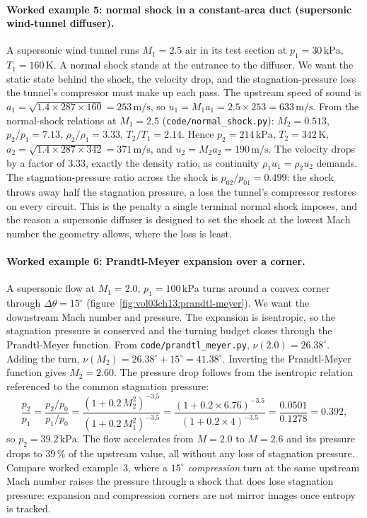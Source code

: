 \paragraph{Worked example 5: normal shock in a constant-area duct
(supersonic wind-tunnel diffuser).} A supersonic wind tunnel runs
$M_1 = 2.5$ air in its test section at $p_1 = 30\,\text{kPa}$,
$T_1 = 160\,\si{\kelvin}$. A normal shock stands at the entrance to the
diffuser. We want the static state behind the shock, the velocity
drop, and the stagnation-pressure loss the tunnel's compressor must
make up each pass. The upstream speed of sound is $a_1 =
\sqrt{1.4\times 287\times 160} = 253\,\si{\meter\per\second}$, so
$u_1 = M_1 a_1 = 2.5\times 253 = 633\,\si{\meter\per\second}$. From the
normal-shock relations at $M_1 = 2.5$
(\texttt{code/normal\_shock.py}): $M_2 = 0.513$, $p_2/p_1 = 7.13$,
$\rho_2/\rho_1 = 3.33$, $T_2/T_1 = 2.14$. Hence $p_2 = 214\,\text{kPa}$,
$T_2 = 342\,\si{\kelvin}$, $a_2 = \sqrt{1.4\times 287\times 342} =
371\,\si{\meter\per\second}$, and $u_2 = M_2 a_2 = 190\,\si{\meter\per
\second}$. The velocity drops by a factor of $3.33$, exactly the
density ratio, as continuity $\rho_1 u_1 = \rho_2 u_2$ demands. The
stagnation-pressure ratio across the shock is
$p_{02}/p_{01} = 0.499$: the shock throws away half the stagnation
pressure, a loss the tunnel's compressor restores on every circuit.
This is the penalty a single terminal normal shock imposes, and the
reason a supersonic diffuser is designed to set the shock at the
lowest Mach number the geometry allows, where the loss is least.

\paragraph{Worked example 6: Prandtl-Meyer expansion over a corner.}
A supersonic flow at $M_1 = 2.0$, $p_1 = 100\,\text{kPa}$ turns around
a convex corner through $\Delta\theta = 15^{\circ}$
(figure~\ref{fig:vol03ch13:prandtl-meyer}). We want the downstream
Mach number and pressure. The expansion is isentropic, so the
stagnation pressure is conserved and the turning budget closes through
the Prandtl-Meyer function. From \texttt{code/prandtl\_meyer.py},
$\nu(2.0) = 26.38^{\circ}$. Adding the turn,
$\nu(M_2) = 26.38^{\circ} + 15^{\circ} = 41.38^{\circ}$. Inverting the
Prandtl-Meyer function gives $M_2 = 2.60$. The pressure drop follows
from the isentropic relation referenced to the common stagnation
pressure:
\[
\frac{p_2}{p_1} = \frac{p_2/p_0}{p_1/p_0}
= \frac{(1 + 0.2\,M_2^2)^{-3.5}}{(1 + 0.2\,M_1^2)^{-3.5}}
= \frac{(1 + 0.2\times 6.76)^{-3.5}}{(1 + 0.2\times 4)^{-3.5}}
= \frac{0.0501}{0.1278} = 0.392,
\]
so $p_2 = 39.2\,\text{kPa}$. The flow accelerates from $M = 2.0$ to
$M = 2.6$ and its pressure drops to $39\,\%$ of the upstream value, all
without any loss of stagnation pressure. Compare worked example~3,
where a $15^{\circ}$ \emph{compression} turn at the same upstream Mach
number raises the pressure through a shock that does lose stagnation
pressure: expansion and compression corners are not mirror images once
entropy is tracked.

